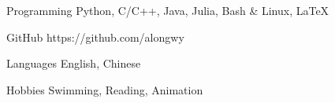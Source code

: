 

\vspace{-1.5mm}
\begin{cvskills}


\cvskill
{Programming} %
{Python, C/C++, Java, Julia, Bash \& Linux, \LaTeX} %


\cvskill
{GitHub} %
{https://github.com/alongwy} %


\cvskill
{Languages} %
{English, Chinese} %

\cvskill
{Hobbies} %
{Swimming, Reading, Animation} %

\end{cvskills}